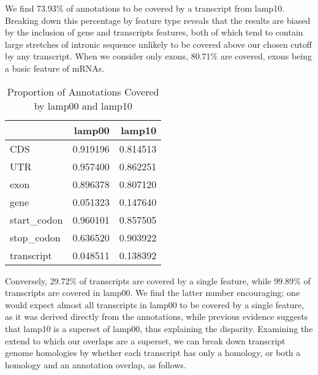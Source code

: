 \documentclass[10pt,twocolumn,linenumbers]{article}
\begin{document}


We find 73.93\%
 of annotations to be covered by a
transcript from lamp10. Breaking down this percentage by feature type reveals that the results are 
biased by the inclusion of gene and transcripts features, both of which tend to contain large stretches 
of intronic sequence unlikely to be covered above our chosen cutoff by any transcript. When we consider 
only exons, 80.71\%
 are covered, 
exons being a basic feature of mRNAs.

\begin{table*}[t]
\caption {Proportion of Annotations Covered by lamp00 and lamp10}
\begin{center}

\begin{tabular}{lrr}
\toprule
{} &    lamp00 &    lamp10 \\
\midrule
CDS         &  0.919196 &  0.814513 \\
UTR         &  0.957400 &  0.862251 \\
exon        &  0.896378 &  0.807120 \\
gene        &  0.051323 &  0.147640 \\
start\_codon &  0.960101 &  0.857505 \\
stop\_codon  &  0.636520 &  0.903922 \\
transcript  &  0.048511 &  0.138392 \\
\bottomrule
\end{tabular}



\end{center}
\end{table*}

Conversely, 29.72\%
 of transcripts are 
covered by a single feature, while 99.89\%
 of 
transcripts are covered in lamp00. We find the latter number encouraging; one would expect almost 
all transcripts in lamp00 to be covered by a single feature, as it was derived directly from the 
annotations, while previous evidence suggests that lamp10 is a superset of lamp00, thus explaining 
the disparity. Examining the extend to which our overlaps are a superset, we can break down transcript 
genome homologies by whether each transcript has only a homology, or both a homology and an annotation 
overlap, as follows.
\end{document}
